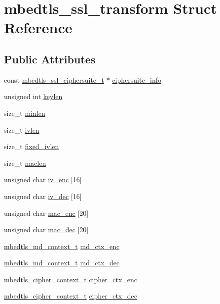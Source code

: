 \hypertarget{structmbedtls__ssl__transform}{\section{mbedtls\-\_\-ssl\-\_\-transform Struct Reference}
\label{structmbedtls__ssl__transform}
}
\subsection*{Public Attributes}
\begin{DoxyCompactItemize}
\item 
const \hyperlink{structmbedtls__ssl__ciphersuite__t}{mbedtls\-\_\-ssl\-\_\-ciphersuite\-\_\-t} $\ast$ \hyperlink{structmbedtls__ssl__transform_a669b64ca817f92c2f2da4531745b5563}{ciphersuite\-\_\-info}
\item 
unsigned int \hyperlink{structmbedtls__ssl__transform_aacb827d7f8a0d31359870c64d213baa9}{keylen}
\item 
size\-\_\-t \hyperlink{structmbedtls__ssl__transform_aaa43c099c7bc4f20f283362fd2feb619}{minlen}
\item 
size\-\_\-t \hyperlink{structmbedtls__ssl__transform_aabfe6c0fea0a8bcaa89823c2f06d885a}{ivlen}
\item 
size\-\_\-t \hyperlink{structmbedtls__ssl__transform_aeb9dc8aee94effb34d725e259e390c2d}{fixed\-\_\-ivlen}
\item 
size\-\_\-t \hyperlink{structmbedtls__ssl__transform_a2b616bec2cc218b736dffe87e58efc56}{maclen}
\item 
unsigned char \hyperlink{structmbedtls__ssl__transform_a5dc42f2d1f720d396c35eb355cba69e2}{iv\-\_\-enc} \mbox{[}16\mbox{]}
\item 
unsigned char \hyperlink{structmbedtls__ssl__transform_ad31f126ea147ffa513cc4ad170d2ff25}{iv\-\_\-dec} \mbox{[}16\mbox{]}
\item 
unsigned char \hyperlink{structmbedtls__ssl__transform_a6f9cda9ccf9ca99b7170f394180f49a2}{mac\-\_\-enc} \mbox{[}20\mbox{]}
\item 
unsigned char \hyperlink{structmbedtls__ssl__transform_a3170985961f116ffc229315acfe91373}{mac\-\_\-dec} \mbox{[}20\mbox{]}
\item 
\hyperlink{structmbedtls__md__context__t}{mbedtls\-\_\-md\-\_\-context\-\_\-t} \hyperlink{structmbedtls__ssl__transform_a17f516488ea4254947d296a53c527af8}{md\-\_\-ctx\-\_\-enc}
\item 
\hyperlink{structmbedtls__md__context__t}{mbedtls\-\_\-md\-\_\-context\-\_\-t} \hyperlink{structmbedtls__ssl__transform_a9d9d8245fb1000d30a9a63191cddf0e0}{md\-\_\-ctx\-\_\-dec}
\item 
\hyperlink{structmbedtls__cipher__context__t}{mbedtls\-\_\-cipher\-\_\-context\-\_\-t} \hyperlink{structmbedtls__ssl__transform_a4a1c49f6f40086491dd8dd059f163a61}{cipher\-\_\-ctx\-\_\-enc}
\item 
\hyperlink{structmbedtls__cipher__context__t}{mbedtls\-\_\-cipher\-\_\-context\-\_\-t} \hyperlink{structmbedtls__ssl__transform_a8f7e9c4b90dda8083df54037e5be955e}{cipher\-\_\-ctx\-\_\-dec}
\end{DoxyCompactItemize}


